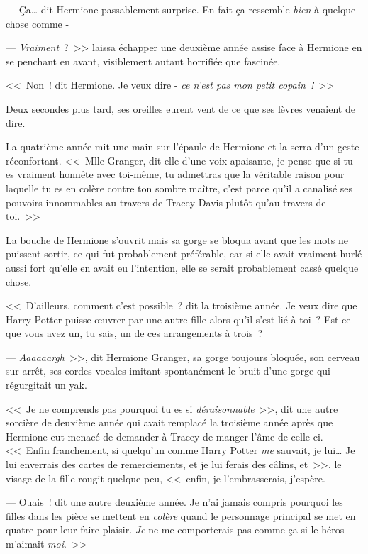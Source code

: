 --- Ça… dit Hermione passablement surprise. En fait ça ressemble \emph{bien} à quelque chose comme -

--- \emph{Vraiment}~?~>> laissa échapper une deuxième année assise face à Hermione en se penchant en avant, visiblement autant horrifiée que fascinée.

<<~Non~! dit Hermione. Je veux dire - \emph{ce n'est pas mon petit copain~!}~>>

Deux secondes plus tard, ses oreilles eurent vent de ce que ses lèvres venaient de dire.

La quatrième année mit une main sur l'épaule de Hermione et la serra d'un geste réconfortant. <<~Mlle Granger, dit-elle d'une voix apaisante, je pense que si tu es vraiment honnête avec toi-même, tu admettras que la véritable raison pour laquelle tu es en colère contre ton sombre maître, c'est parce qu'il a canalisé ses pouvoirs innommables au travers de Tracey Davis plutôt qu'au travers de toi.~>>

La bouche de Hermione s'ouvrit mais sa gorge se bloqua avant que les mots ne puissent sortir, ce qui fut probablement préférable, car si elle avait vraiment hurlé aussi fort qu'elle en avait eu l'intention, elle se serait probablement cassé quelque chose.

<<~D'ailleurs, comment c'est possible~? dit la troisième année. Je veux dire que Harry Potter puisse œuvrer par une autre fille alors qu'il s'est lié à toi~? Est-ce que vous avez un, tu sais, un de ces arrangements à trois~?

--- \emph{Aaaaaargh}~>>, dit Hermione Granger, sa gorge toujours bloquée, son cerveau sur arrêt, ses cordes vocales imitant spontanément le bruit d'une gorge qui régurgitait un yak.


<<~Je ne comprends pas pourquoi tu es si \emph{déraisonnable}~>>, dit une autre sorcière de deuxième année qui avait remplacé la troisième année après que Hermione eut menacé de demander à Tracey de manger l'âme de celle-ci. <<~Enfin franchement, si quelqu'un comme Harry Potter \emph{me} sauvait, je lui… Je lui enverrais des cartes de remerciements, et je lui ferais des câlins, et~>>, le visage de la fille rougit quelque peu, <<~enfin, je l'embrasserais, j'espère.

--- Ouais~! dit une autre deuxième année. Je n'ai jamais compris pourquoi les filles dans les pièce se mettent en \emph{colère} quand le personnage principal se met en quatre pour leur faire plaisir. \emph{Je} ne me comporterais pas comme ça si le héros m'aimait \emph{moi}.~>>

